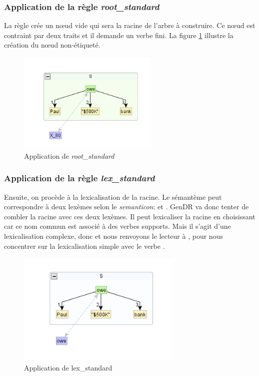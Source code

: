 \subsubsection{Application de la règle \emph{root\_standard}}
La règle crée un n\oe{}ud vide qui sera la racine de l'arbre à construire. Ce n\oe{}ud est contraint par deux traits et il demande un verbe fini. La figure \ref{fig:rootstand} illustre la création du n\oe{}ud non-étiqueté.
\begin{figure}[htb]
	\centering
	\includegraphics[width=0.6\textwidth, trim = {0cm 0cm 0cm 0cm},clip]{ch3/figs/inspecteur_root.png}
	\vspace{-0.5cm}
	\caption{Application de \emph{root\_standard}}
	\label{fig:rootstand}
\end{figure}

\subsubsection{Application de la règle \emph{lex\_standard}}
Ensuite, on procède à la lexicalisation de la racine. Le sémantème  peut correspondre à deux lexèmes selon le \emph{semanticon}:  et . GenDR va donc tenter de combler la racine avec ces deux lexèmes. Il peut lexicaliser la racine en choisissant  car ce nom commun est associé à des verbes supports. Mais il s'agit d'une lexicalisation complexe, donc et nous renvoyons le lecteur à \cite{lambrey15,LambreyImplementationcollocationspour2017,lareau18}, pour nous concentrer sur la lexicalisation simple avec le verbe .

\begin{figure}[htb]
	\centering
	\includegraphics[width=0.7\textwidth, trim = {0cm 0cm 0cm 0cm},clip]{ch3/figs/lex_standard_root.png}
		\vspace{-0.5cm}
	\caption{Application de lex\_standard}
	\label{fig:lexstand1}
\end{figure}

